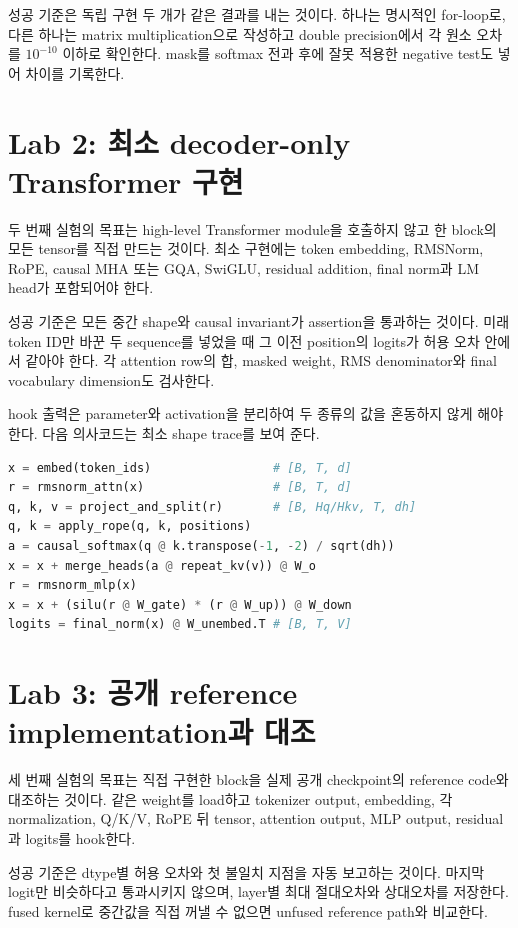 성공 기준은 독립 구현 두 개가 같은 결과를 내는 것이다.
하나는 명시적인 for-loop로, 다른 하나는 matrix multiplication으로 작성하고 double precision에서 각 원소 오차를 $10^{-10}$ 이하로 확인한다.
mask를 softmax 전과 후에 잘못 적용한 negative test도 넣어 차이를 기록한다.

\section{Lab 2: 최소 decoder-only Transformer 구현}

두 번째 실험의 목표는 high-level Transformer module을 호출하지 않고 한 block의 모든 tensor를 직접 만드는 것이다.
최소 구현에는 token embedding, RMSNorm, RoPE, causal MHA 또는 GQA, SwiGLU, residual addition, final norm과 LM head가 포함되어야 한다.

성공 기준은 모든 중간 shape와 causal invariant가 assertion을 통과하는 것이다.
미래 token ID만 바꾼 두 sequence를 넣었을 때 그 이전 position의 logits가 허용 오차 안에서 같아야 한다.
각 attention row의 합, masked weight, RMS denominator와 final vocabulary dimension도 검사한다.

hook 출력은 parameter와 activation을 분리하여 두 종류의 값을 혼동하지 않게 해야 한다.
다음 의사코드는 최소 shape trace를 보여 준다.

\begin{lstlisting}[language=Python,caption={한 block의 shape 추적 의사코드}]
x = embed(token_ids)                 # [B, T, d]
r = rmsnorm_attn(x)                  # [B, T, d]
q, k, v = project_and_split(r)       # [B, Hq/Hkv, T, dh]
q, k = apply_rope(q, k, positions)
a = causal_softmax(q @ k.transpose(-1, -2) / sqrt(dh))
x = x + merge_heads(a @ repeat_kv(v)) @ W_o
r = rmsnorm_mlp(x)
x = x + (silu(r @ W_gate) * (r @ W_up)) @ W_down
logits = final_norm(x) @ W_unembed.T # [B, T, V]
\end{lstlisting}

\section{Lab 3: 공개 reference implementation과 대조}

세 번째 실험의 목표는 직접 구현한 block을 실제 공개 checkpoint의 reference code와 대조하는 것이다.
같은 weight를 load하고 tokenizer output, embedding, 각 normalization, Q/K/V, RoPE 뒤 tensor, attention output, MLP output, residual과 logits를 hook한다.

성공 기준은 dtype별 허용 오차와 첫 불일치 지점을 자동 보고하는 것이다.
마지막 logit만 비슷하다고 통과시키지 않으며, layer별 최대 절대오차와 상대오차를 저장한다.
fused kernel로 중간값을 직접 꺼낼 수 없으면 unfused reference path와 비교한다.

